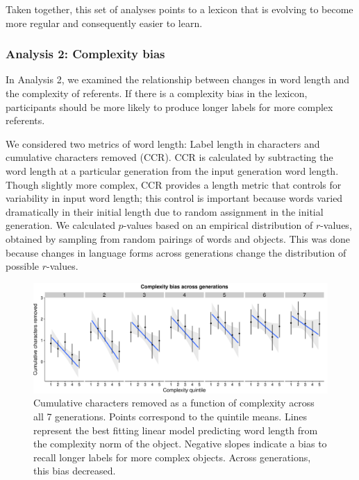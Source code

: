 Taken together, this set of analyses points to a lexicon that is evolving to become more regular and consequently easier to learn.



\subsubsection{Analysis 2: Complexity bias} 

In Analysis  2, we examined the relationship between changes in word length and the complexity of referents. If there is a complexity bias in the lexicon, participants should be more likely to produce longer labels for more complex referents. 

We considered two metrics of word length: Label length in characters and cumulative characters removed (CCR). CCR is calculated by subtracting the word length at a particular generation from the input generation word length. Though slightly more complex, CCR provides a length metric that controls for variability in input word length; this control is important because words varied dramatically in their initial length due to random assignment in the initial generation. We calculated $p$-values based on an empirical distribution of $r$-values, obtained by sampling from random pairings of words and objects. This was done because changes in  language forms across generations change the distribution of possible $r$-values.

\begin{figure}[t!]
\begin{center}
\includegraphics[scale = .38]{figs/complexity_bias.pdf}
\end{center}

\caption{Cumulative characters removed as a function of complexity across all 7 generations. Points correspond to the quintile means. Lines represent the best fitting linear model predicting word length from the complexity norm of the object. Negative slopes indicate a bias to recall longer labels for  more complex objects. Across generations, this bias decreased.}
\label{fig:cbias}
\end{figure}




